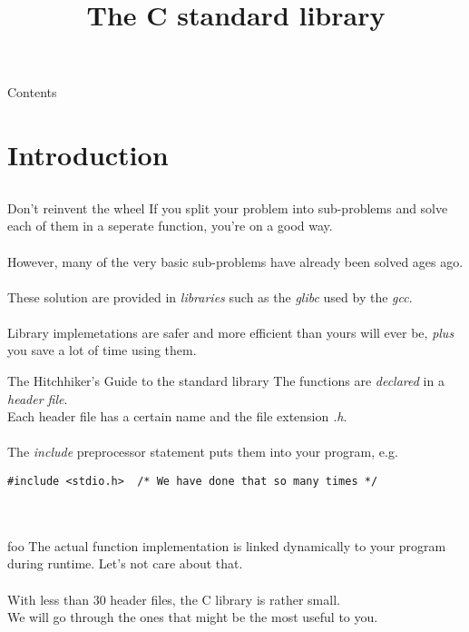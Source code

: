 
\newcommand{\topic}{
	The C standard library
}

\title{\topic}
\supertitle{\course}
\date{}



\maketitle

\begin{frame}{Contents}
	\tableofcontents
\end{frame}

\section{Introduction}
\subsection{}
\begin{frame}{Don't reinvent the wheel}
	If you split your problem into sub-problems and solve each of them in a seperate function, you're on a good way. \\ \ \\
	However, many of the very basic sub-problems have already been solved ages ago. \\ \ \\
	These solution are provided in \textit{libraries} such as the \textit{glibc} used by the \textit{gcc}. \\ \ \\
	Library implemetations are safer and more efficient than yours will ever be, \textit{plus} you save a lot of time using them.
\end{frame}
\begin{frame}[fragile]{The Hitchhiker's Guide to the standard library}
	The functions are \textit{declared} in a \textit{header file}. \\
	Each header file has a certain name and the file extension \textit{.h}. \\ \ \\
	The \textit{include} preprocessor statement puts them into your program, e.g.
\begin{lstlisting}[numbers=none]
#include <stdio.h>	/* We have done that so many times */
\end{lstlisting} \ \\ \ \\foo
	The actual function implementation is linked dynamically to your program during runtime. Let's not care about that. \\ \ \\
	With less than 30 header files, the C library is rather small. \\
	We will go through the ones that might be the most useful to you.
\end{frame}
